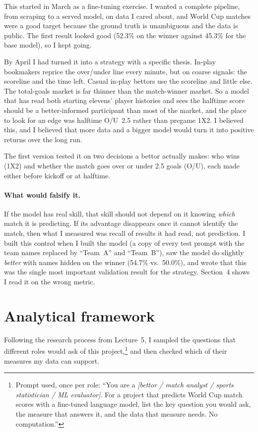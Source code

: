 \documentclass[10pt,letterpaper]{article}
\begin{document}
This started in March as a fine-tuning exercise. I wanted a complete pipeline, from scraping
to a served model, on data I cared about, and World Cup matches were a good target because
the ground truth is unambiguous and the data is public. The first result looked good
(52.3\% on the winner against 45.3\% for the base model), so I kept going.

By April I had turned it into a strategy with a specific thesis. In-play bookmakers reprice
the over/under line every minute, but on coarse signals: the scoreline and the time left.
Casual in-play bettors use the scoreline and little else. The total-goals market is far
thinner than the match-winner market. So a model that has read both starting elevens'
player histories and sees the halftime score should be a better-informed participant than
most of the market, and the place to look for an edge was halftime O/U~2.5 rather than
pregame 1X2. I believed this, and I believed that more data and a bigger model would turn it
into positive returns over the long run.

The first version tested it on two decisions a bettor actually makes: who wins (1X2) and
whether the match goes over or under 2.5 goals (O/U), each made either before kickoff or at
halftime.

\paragraph{What would falsify it.} If the model has real skill, that skill should not depend on
it knowing \emph{which} match it is predicting. If its advantage disappears once it cannot
identify the match, then what I measured was recall of results it had read, not prediction.
I built this control when I built the model (a copy of every test prompt with the team names
replaced by ``Team~A'' and ``Team~B''), saw the model do slightly \emph{better} with names
hidden on the winner (54.7\% vs.\ 50.0\%), and wrote that this was the single most important
validation result for the strategy. Section~4 shows I read it on the wrong metric.

\section{Analytical framework}

Following the research process from Lecture~5, I sampled the questions that different roles
would ask of this project,\footnote{Prompt used, once per role: ``You are a
\emph{[bettor / match analyst / sports statistician / ML evaluator]}. For a project that
predicts World Cup match scores with a fine-tuned language model, list the key question you
would ask, the measure that answers it, and the data that measure needs. No computation.''}
and then checked which of their measures my data can support.
\end{document}
